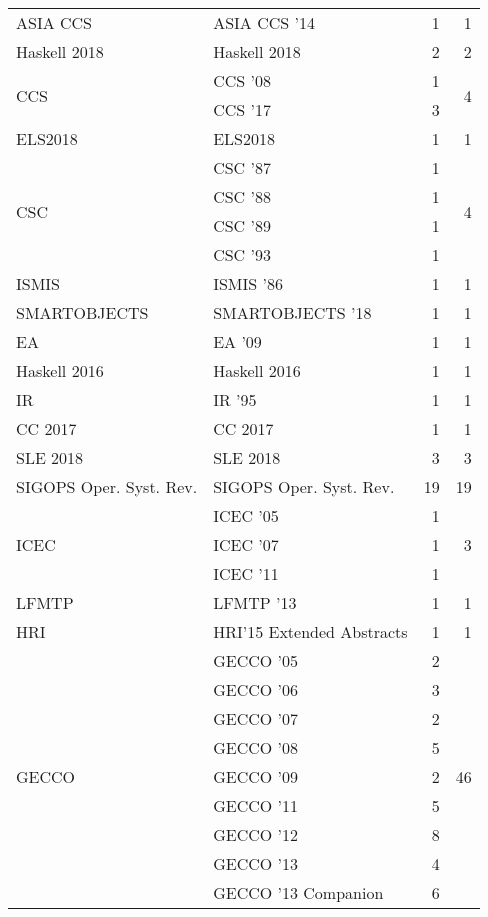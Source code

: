 \begin{table*}[t]
\begin{tabular}{llrr}
\multirow{1}{*}{ASIA CCS } & ASIA CCS '14 & 1 & \multirow{1}{*}{1}\\
\multirow{1}{*}{Haskell 2018} & Haskell 2018 & 2 & \multirow{1}{*}{2}\\
\multirow{2}{*}{CCS } & CCS '08 & 1 & \multirow{2}{*}{4}\\
& CCS '17 & 3 &\\
\multirow{1}{*}{ELS2018} & ELS2018 & 1 & \multirow{1}{*}{1}\\
\multirow{4}{*}{CSC } & CSC '87 & 1 & \multirow{4}{*}{4}\\
& CSC '88 & 1 &\\
& CSC '89 & 1 &\\
& CSC '93 & 1 &\\
\multirow{1}{*}{ISMIS } & ISMIS '86 & 1 & \multirow{1}{*}{1}\\
\multirow{1}{*}{SMARTOBJECTS } & SMARTOBJECTS '18 & 1 & \multirow{1}{*}{1}\\
\multirow{1}{*}{EA } & EA '09 & 1 & \multirow{1}{*}{1}\\
\multirow{1}{*}{Haskell 2016} & Haskell 2016 & 1 & \multirow{1}{*}{1}\\
\multirow{1}{*}{IR } & IR '95 & 1 & \multirow{1}{*}{1}\\
\multirow{1}{*}{CC 2017} & CC 2017 & 1 & \multirow{1}{*}{1}\\
\multirow{1}{*}{SLE 2018} & SLE 2018 & 3 & \multirow{1}{*}{3}\\
\multirow{1}{*}{SIGOPS Oper. Syst. Rev.} & SIGOPS Oper. Syst. Rev. & 19 & \multirow{1}{*}{19}\\
\multirow{3}{*}{ICEC } & ICEC '05 & 1 & \multirow{3}{*}{3}\\
& ICEC '07 & 1 &\\
& ICEC '11 & 1 &\\
\multirow{1}{*}{LFMTP } & LFMTP '13 & 1 & \multirow{1}{*}{1}\\
\multirow{1}{*}{HRI} & HRI'15 Extended Abstracts & 1 & \multirow{1}{*}{1}\\
\multirow{12}{*}{GECCO } & GECCO '05 & 2 & \multirow{12}{*}{46}\\
& GECCO '06 & 3 &\\
& GECCO '07 & 2 &\\
& GECCO '08 & 5 &\\
& GECCO '09 & 2 &\\
& GECCO '11 & 5 &\\
& GECCO '12 & 8 &\\
& GECCO '13 & 4 &\\
& GECCO '13 Companion & 6 &\\

\end{tabular}
\end{table*}
